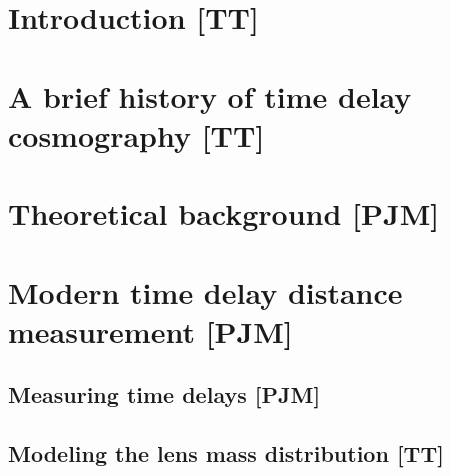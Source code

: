 
\section{Introduction [TT]}
\label{sec:intro}




\section{A brief history of time delay cosmography [TT]}
\label{sec:history}




\section{Theoretical background [PJM]}
\label{sec:theory}




\section{Modern time delay distance measurement [PJM]}
\label{sec:measurement}




\subsection{Measuring time delays [PJM]}
\label{sec:measurement:timedelay}




\subsection{Modeling the lens mass distribution [TT]}
\label{sec:measurement:lensmodel}

